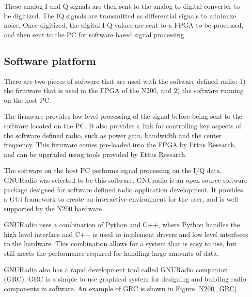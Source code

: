 These analog I and Q signals are then sent to the analog to digital converter to be digitized.  The IQ signals are transmitted as differential signals to minimize noise.  Once digitized, the digital I-Q values are sent to a FPGA to be processed, and then sent to the PC for software based signal processing.

\subsection{Software platform} \label{software_platform}

There are two pieces of software that are used with the software defined radio:  1) the firmware that is used in the FPGA of the N200, and 2) the software running on the host PC.  

The firmware provides low level processing of the signal before being sent to the software located on the PC.  It also provides a link for controlling key aspects of the software defined radio, such as power gain, bandwidth and the center frequency.  This firmware comes pre-loaded into the FPGA by Ettus Research, and can be upgraded using tools provided by Ettus Research.

The software on the host PC performs signal processing on the I/Q data.  GNURadio was selected to be this software.   GNUradio is an open source software package designed for software defined radio application development.  It provides a GUI framework to create an interactive environment for the user, and is well supported by the N200 hardware.  

GNURadio uses a combination of Python and C++, where Python handles the high level interface and C++ is used to implement drivers and low level interfaces to the hardware.  This combination allows for a system that is easy to use, but still meets the performance required for handling large amounts of data. 

GNURadio also has a rapid development tool called GNURadio companion (GRC).  GRC is a simple to use graphical system for designing and building radio components in software. An example of GRC is shown in Figure \ref{N200_GRC}.

